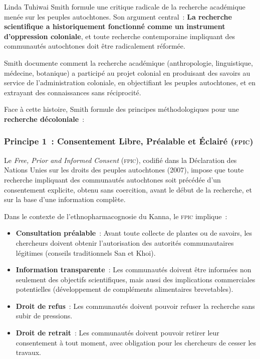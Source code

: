 \documentclass[12pt,a4paper,twoside]{book}
\newcommand{\fpic}{\textsc{fpic}}
\begin{document}
Linda Tuhiwai Smith \parencite{smith1999} formule une critique radicale de la recherche académique menée sur les peuples autochtones. Son argument central~: \textbf{La recherche scientifique a historiquement fonctionné comme un instrument d'oppression coloniale}, et toute recherche contemporaine impliquant des communautés autochtones doit être radicalement réformée.

Smith documente comment la recherche académique (anthropologie, linguistique, médecine, botanique) a participé au projet colonial en produisant des savoirs au service de l'administration coloniale, en objectifiant les peuples autochtones, et en extrayant des connaissances sans réciprocité.

Face à cette histoire, Smith formule des principes méthodologiques pour une \textbf{recherche décoloniale}~:

\subsubsection{Principe 1~: Consentement Libre, Préalable et Éclairé (\fpic{})}

Le \textit{Free, Prior and Informed Consent} (\fpic{}), codifié dans la Déclaration des Nations Unies sur les droits des peuples autochtones (2007), impose que toute recherche impliquant des communautés autochtones soit précédée d'un consentement explicite, obtenu sans coercition, avant le début de la recherche, et sur la base d'une information complète.

Dans le contexte de l'ethnopharmacognosie du Kanna, le \fpic{} implique~:

\begin{itemize}
\item \textbf{Consultation préalable}~: Avant toute collecte de plantes ou de savoirs, les chercheurs doivent obtenir l'autorisation des autorités communautaires légitimes (conseils traditionnels San et Khoi).

\item \textbf{Information transparente}~: Les communautés doivent être informées non seulement des objectifs scientifiques, mais aussi des implications commerciales potentielles (développement de compléments alimentaires brevetables).

\item \textbf{Droit de refus}~: Les communautés doivent pouvoir refuser la recherche sans subir de pressions.

\item \textbf{Droit de retrait}~: Les communautés doivent pouvoir retirer leur consentement à tout moment, avec obligation pour les chercheurs de cesser les travaux.
\end{itemize}
\end{document}
